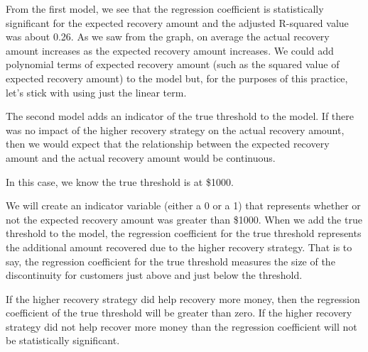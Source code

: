 \documentclass[11pt]{article}
\begin{document}
From the first model, we see that the regression coefficient is
statistically significant for the expected recovery amount and the
adjusted R-squared value was about 0.26. As we saw from the graph, on
average the actual recovery amount increases as the expected recovery
amount increases. We could add polynomial terms of expected recovery
amount (such as the squared value of expected recovery amount) to the
model but, for the purposes of this practice, let's stick with using
just the linear term.

The second model adds an indicator of the true threshold to the model.
If there was no impact of the higher recovery strategy on the actual
recovery amount, then we would expect that the relationship between the
expected recovery amount and the actual recovery amount would be
continuous.

In this case, we know the true threshold is at \$1000.

We will create an indicator variable (either a 0 or a 1) that represents
whether or not the expected recovery amount was greater than \$1000.
When we add the true threshold to the model, the regression coefficient
for the true threshold represents the additional amount recovered due to
the higher recovery strategy. That is to say, the regression coefficient
for the true threshold measures the size of the discontinuity for
customers just above and just below the threshold.

If the higher recovery strategy did help recovery more money, then the
regression coefficient of the true threshold will be greater than zero.
If the higher recovery strategy did not help recover more money than the
regression coefficient will not be statistically significant.
\end{document}
